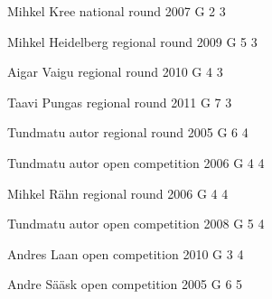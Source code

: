 \documentclass[11pt]{article}
\begin{document}
\ylDisplay{} %
{Mihkel Kree} %
{national round} %
{2007} %
{G 2} %
{3} %
{

\ifEngStatement
\fi
}

\ylDisplay{} %
{Mihkel Heidelberg} %
{regional round} %
{2009} %
{G 5} %
{3} %
{

\ifEngStatement
\fi
}

\ylDisplay{} %
{Aigar Vaigu} %
{regional round} %
{2010} %
{G 4} %
{3} %
{

\ifEngStatement
\fi
}

\ylDisplay{} %
{Taavi Pungas} %
{regional round} %
{2011} %
{G 7} %
{3} %
{

\ifEngStatement
\fi
}

\ylDisplay{} %
{Tundmatu autor} %
{regional round} %
{2005} %
{G 6} %
{4} %
{

\ifEngStatement
\fi
}

\ylDisplay{} %
{Tundmatu autor} %
{open competition} %
{2006} %
{G 4} %
{4} %
{

\ifEngStatement
\fi
}

\ylDisplay{} %
{Mihkel Rähn} %
{regional round} %
{2006} %
{G 4} %
{4} %
{

\ifEngStatement
\fi
}

\ylDisplay{} %
{Tundmatu autor} %
{open competition} %
{2008} %
{G 5} %
{4} %
{

\ifEngStatement
\fi
}

\ylDisplay{} %
{Andres Laan} %
{open competition} %
{2010} %
{G 3} %
{4} %
{

\ifEngStatement
\fi
}

\ylDisplay{} %
{Andre Sääsk} %
{open competition} %
{2005} %
{G 6} %
{5} %
{

\ifEngStatement
\fi
}
\end{document}

